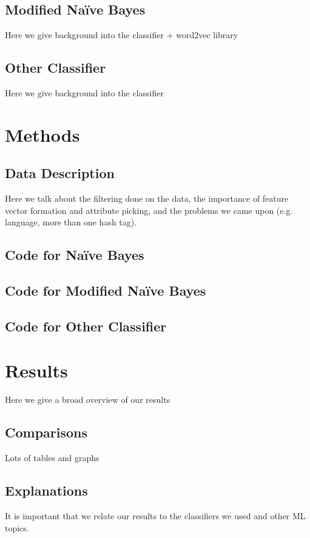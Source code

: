\documentclass[11pt,letterpaper]{article}
\begin{document}
\subsection{Modified Na{\"i}ve Bayes}
Here we give background into the classifier + word2vec library

\subsection{Other Classifier}
Here we give background into the classifier

\section{Methods}
\subsection{Data Description}
Here we talk about the filtering done on the data, the importance of feature vector formation and attribute picking, and the problems we came upon (e.g. language, more than one hash tag).

\subsection{Code for Na{\"i}ve Bayes}

\subsection{Code for Modified Na{\"i}ve Bayes}

\subsection{Code for Other Classifier}

\section{Results}
Here we give a broad overview of our results

\subsection{Comparisons}
Lots of tables and graphs

\subsection{Explanations}
It is important that we relate our results  to the classifiers we used and other ML topics.
\end{document}
